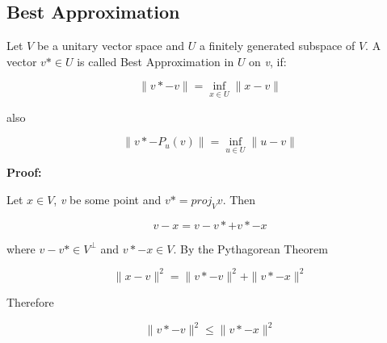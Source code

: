 \subsection{Best Approximation}

Let \(V\) be a unitary vector space and \(U\) a finitely generated subspace of \(V\).
A vector \(v* \in U\) is called Best Approximation in \(U\) on \emph{v}, if:

\[
    \|v* - v\| = \inf_{x \in U}\|x - v\|
\]

also

\[
    \|v* - P_u(v)\| = \inf_{u \in U}\|u - v\|
\]

\textbf{Proof:}

Let \(x \in V\), \emph{v} be some point and \(v* = proj_{V} v\). Then 

\[
    v - x = v - v* + v* - x
\]

where \(v - v* \in V^{\bot}\) and \(v* - x \in V\). By the Pythagorean Theorem

\[
    \| x - v \|^2 = \|v* - v\|^2 + \|v* - x\|^2
\]

Therefore

\[
    \|v* - v\|^2 \le \|v* - x\|^2
\]

\QED

